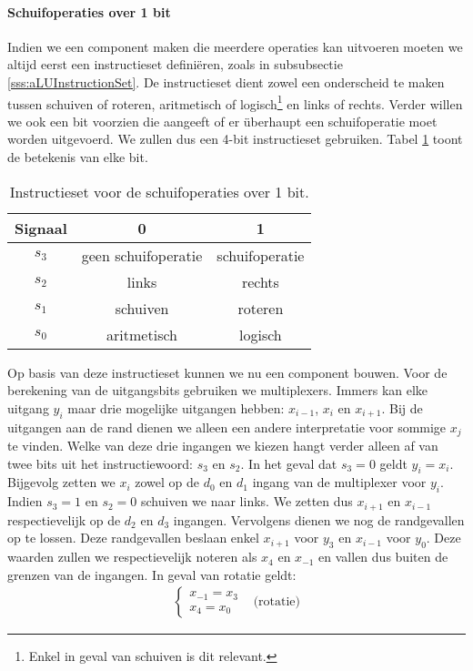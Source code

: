 \paragraph{Schuifoperaties over 1 bit}
Indien we een component maken die meerdere operaties kan uitvoeren moeten we altijd eerst een instructieset defini\"eren, zoals in subsubsectie \ref{sss:aLUInstructionSet}. De instructieset dient zowel een onderscheid te maken tussen schuiven of roteren, aritmetisch of logisch\footnote{Enkel in geval van schuiven is dit relevant.} en links of rechts. Verder willen we ook een bit voorzien die aangeeft of er \"uberhaupt een schuifoperatie moet worden uitgevoerd. We zullen dus een 4-bit instructieset gebruiken. Tabel \ref{tbl:shiftInstructionSet} toont de betekenis van elke bit.
\begin{table}[hbt]
\centering
\begin{tabular}{c|cc}
Signaal&0&1\\\hline
$s_3$&geen schuifoperatie&schuifoperatie\\
$s_2$&links&rechts\\
$s_1$&schuiven&roteren\\
$s_0$&aritmetisch&logisch
\end{tabular}
\caption{Instructieset voor de schuifoperaties over 1 bit.}
\label{tbl:shiftInstructionSet}
\end{table}
Op basis van deze instructieset kunnen we nu een component bouwen. Voor de berekening van de uitgangsbits gebruiken we multiplexers. Immers kan elke uitgang $y_i$ maar drie mogelijke uitgangen hebben: $x_{i-1}$, $x_i$ en $x_{i+1}$. Bij de uitgangen aan de rand dienen we alleen een andere interpretatie voor sommige $x_j$ te vinden. Welke van deze drie ingangen we kiezen hangt verder alleen af van twee bits uit het instructiewoord: $s_3$ en $s_2$. In het geval dat $s_3=0$ geldt $y_i=x_i$. Bijgevolg zetten we $x_i$ zowel op de $d_0$ en $d_1$ ingang van de multiplexer voor $y_i$. Indien $s_3=1$ en $s_2=0$ schuiven we naar links. We zetten dus $x_{i+1}$ en $x_{i-1}$ respectievelijk op de $d_2$ en $d_3$ ingangen. Vervolgens dienen we nog de randgevallen op te lossen. Deze randgevallen beslaan enkel $x_{i+1}$ voor $y_3$ en  $x_{i-1}$ voor $y_0$. Deze waarden zullen we respectievelijk noteren als $x_4$ en $x_{-1}$ en vallen dus buiten de grenzen van de ingangen. In geval van rotatie geldt:
\begin{equation}
\begin{array}{ll}
\left\{\begin{array}{l}
x_{-1}=x_3\\
x_4=x_0
\end{array}\right.&\mbox{(rotatie)}
\end{array}
\end{equation}
